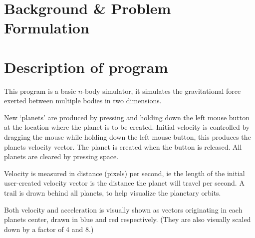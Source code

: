 \documentclass[titlepage, oneside, a4paper, 11pt]{article}
\def\title{Interactive two-dimensional n-body simulation on
  gravitational force}
\def\course{Matematik breddning: Mathematical modeling}
\def\author{Viktor Qvarfordt}
\def\examiner{Charles Sacilotto}
\def\school{Internationella Kunskapsgymnasiet}
\begin{document}



\section{Background \& Problem Formulation}


\section{Description of program}

This program is a basic $n$-body simulator, it simulates the
gravitational force exerted between multiple bodies in two dimensions.

New `planets' are produced by pressing and holding down the left mouse
button at the location where the planet is to be created. Initial
velocity is controlled by dragging the mouse while holding down the
left mouse button, this produces the planets velocity vector. The
planet is created when the button is released. All planets are cleared
by pressing space.

Velocity is measured in distance (pixels) per second, ie the length of
the initial user-created velocity vector is the distance the planet
will travel per second. A trail is drawn behind all planets, to help
visualize the planetary orbits.

Both velocity and acceleration is visually shown as vectors
originating in each planets center, drawn in blue and red
respectively. (They are also visually scaled down by a factor of 4 and
8.)
\end{document}
